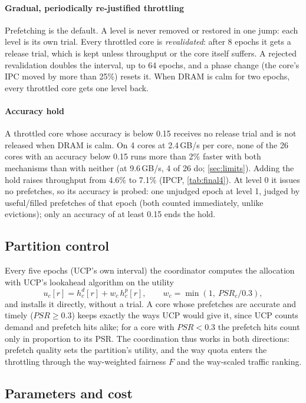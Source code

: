 \paragraph{Gradual, periodically re-justified throttling}
Prefetching is the default.  A level is never removed or restored in one jump: each level is its own trial.  Every
throttled core is \emph{revalidated}: after 8 epochs it gets a release trial, which is kept unless throughput or the
core itself suffers.  A rejected revalidation doubles the interval, up to 64 epochs, and a phase change (the core's IPC
moved by more than 25\%) resets it.  When DRAM is calm for two epochs, every throttled core gets one level back.

\paragraph{Accuracy hold}
A throttled core whose accuracy is below 0.15 receives no release trial and is not released when DRAM is calm.
On 4 cores at 2.4\,GB/s per core, none of the 26 cores with an accuracy below 0.15 runs more than 2\% faster with both
mechanisms than with neither (at 9.6\,GB/s, 4 of 26 do; \cref{sec:limits}).  Adding the hold raises throughput from
4.6\% to 7.1\% (IPCP, \cref{tab:final4}).
At level 0 it issues no prefetches, so its accuracy is probed: one unjudged epoch at level 1, judged by
useful/filled prefetches of that epoch (both counted immediately, unlike evictions); only an accuracy of at least
0.15 ends the hold.

\subsection{Partition control}
Every five epochs (UCP's own interval) the coordinator computes the allocation with UCP's lookahead algorithm on the
utility
\[
  u_c[r] = h^d_c[r] + w_c\, h^p_c[r], \qquad w_c=\min\!\left(1,\ \mathit{PSR}_c/0.3\right),
\]
and installs it directly, without a trial.  A core whose prefetches are accurate and timely ($\mathit{PSR}\ge0.3$)
keeps exactly the ways UCP would give it, since UCP counts demand and prefetch hits alike; for a core with
$\mathit{PSR}<0.3$ the prefetch hits count only in proportion to its PSR.  The coordination thus works in both
directions: prefetch quality sets the partition's utility, and the way quota enters the throttling through the
way-weighted fairness $F$ and the way-scaled traffic ranking.

\subsection{Parameters and cost}

